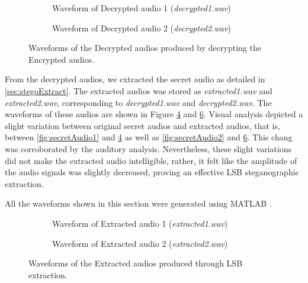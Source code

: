 \documentclass{article}
\begin{document}
\begin{figure}[!h]
    \begin{subfigure}[h]{0.45\textwidth}
        \begin{center}
            
            \caption{Waveform of Decrypted audio 1 (\textit{decrypted1.wav})}
            \label{fig:decrypted1}
        \end{center}
    \end{subfigure}
    \hfill
    \begin{subfigure}[h]{0.45\textwidth}
        \begin{center}
            
            \caption{Waveform of Decrypted audio 2 (\textit{decrypted2.wav})}
            \label{fig:decrypted2}
        \end{center}
    \end{subfigure}
    \caption{Waveforms of the Decrypted audios produced by decrypting the Encrypted audios.}
\end{figure}

From the decrypted audios, we extracted the secret audio as detailed in \ref{sec:stegoExtract}. The extracted audios was stored as \textit{extracted1.wav} and \textit{extracted2.wav}, corresponding to \textit{decrypted1.wav} and \textit{decrypted2.wav}. The waveforms of these audios are shown in Figure \ref{fig:extracted1} and \ref{fig:extracted2}. Visual analysis depicted a slight variation between original secret audios and extracted audios, that is, between \ref{fig:secretAudio1} and \ref{fig:extracted1} as well as \ref{fig:secretAudio2} and \ref{fig:extracted2}. This chang was corroborated by the auditory analysis. Nevertheless, these slight variations did not make the extracted audio intelligible, rather, it felt like the amplitude of the audio signals was slightly decreased, proving an effective LSB steganographic extraction.

All the waveforms shown in this section were generated using MATLAB \cite{MATLAB:R2016a}.
\begin{figure}[H]
    \begin{subfigure}[h]{0.45\textwidth}
        \begin{center}
            
            \caption{Waveform of Extracted audio 1 (\textit{extracted1.wav})}
            \label{fig:extracted1}
        \end{center}
    \end{subfigure}
    \hfill
    \begin{subfigure}[h]{0.45\textwidth}
        \begin{center}
            
            \caption{Waveform of Extracted audio 2 (\textit{extracted2.wav})}
            \label{fig:extracted2}
        \end{center}
    \end{subfigure}
    \caption{Waveforms of the Extracted audios produced through LSB extraction.}
\end{figure}
\end{document}
